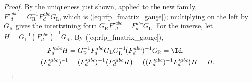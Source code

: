 \begin{proof}
    By the uniqueness just shown, applied to the new family,
    $F'^{abc}_d=G_{\mathrm R}^{-1}F^{abc}_dG_{\mathrm L}$, which is
    (\ref{eq:rfp_fmatrix_gauge}); multiplying on the left by $G_{\mathrm R}$
    gives the intertwining form $G_{\mathrm R}F'^{abc}_d=F^{abc}_dG_{\mathrm L}$.
    For the inverse, let
    $H=G_{\mathrm L}^{-1}(F^{abc}_d)^{-1}G_{\mathrm R}$. By
    (\ref{eq:rfp_fmatrix_gauge}),
    \begin{align}
        F'^{abc}_dH
         & =G_{\mathrm R}^{-1}F^{abc}_dG_{\mathrm L}G_{\mathrm L}^{-1}
        (F^{abc}_d)^{-1}G_{\mathrm R}=\Id,
        \notag                                                         \\
        (F'^{abc}_d)^{-1}
         & =(F'^{abc}_d)^{-1}\bigl(F'^{abc}_dH\bigr)
        =\bigl((F'^{abc}_d)^{-1}F'^{abc}_d\bigr)H=H.
        \notag
    \end{align}
\end{proof}

